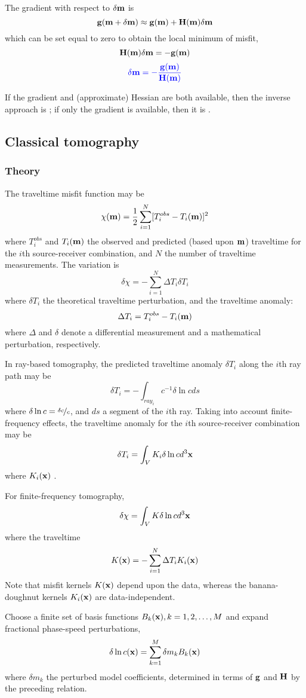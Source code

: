 The gradient with respect to $\delta\mathbf{m}$ is
\[ \mathbf{g}(\mathbf{m}+\delta\mathbf{m})\approx\mathbf{g}(\mathbf{m})+\mathbf{H}(\mathbf{m})\delta\mathbf{m} \]
which can be set equal to zero to obtain the local minimum of misfit,
\[ \mathbf{H}(\mathbf{m})\delta\mathbf{m}=-\mathbf{g}(\mathbf{m}) \]
\[ {\color{blue}\delta\mathbf{m}=-\frac{\mathbf{g}(\mathbf{m})}{\mathbf{H}(\mathbf{m})}} \]

If the gradient and (approximate) Hessian are both available,
then the inverse approach is ;
if only the gradient is available, then it is .

\subsection{Classical tomography}
\subsubsection{Theory}
The traveltime misfit function may be
\[ \chi(\mathbf{m})=\frac{1}{2}\sum_{i=1}^N[T_i^{obs}-T_i(\mathbf{m})]^2 \]
where $T_i^{obs}$ and $T_i(\mathbf{m})$ the observed and predicted (based upon $\mathbf{m}$) traveltime
for the $i$th source-receiver combination, and $N$ the number of traveltime measurements.
The variation is
\[ \delta\chi=-\sum_{i=1}^N\Delta T_i\delta T_i \]
where $\delta T_i$ the theoretical traveltime perturbation, and the traveltime anomaly:
\[ \Delta T_i=T_i^{obs}-T_i(\mathbf{m}) \]
where $\Delta$ and $\delta$ denote a differential measurement and a mathematical perturbation,
respectively.

In ray-based tomography,
the predicted traveltime anomaly $\delta T_i$ along the $i$th ray path may be
\[ \delta T_i=-\int_{ray_i}c^{-1}\delta\ln cds \]
where  $\delta\ln c=\nicefrac{\delta c}{c}$,
and $ds$ a segment of the $i$th ray.
Taking into account finite-frequency effects,
the traveltime anomaly for the $i$th source-receiver combination may be
\[ \delta T_i=\int_VK_i\delta\ln cd^3\mathbf{x} \]
where $K_i(\mathbf{x})$ .

For finite-frequency tomography,
\[ \delta\chi=\int_VK\delta\ln cd^3\mathbf{x} \]
where the traveltime 
\[ K(\mathbf{x})=-\sum_{i=1}^N\Delta T_iK_i(\mathbf{x}) \]
Note that misfit kernels $K(\mathbf{x})$ depend upon the data,
whereas the banana-doughnut kernels $K_i(\mathbf{x})$ are data-independent.

Choose a finite set of basis functions $B_k(\mathbf{x}),k=1,2,\ldots,M$
and expand fractional phase-speed perturbations,
\[ \delta\ln c(\mathbf{x})=\sum_{k=1}^M\delta m_kB_k(\mathbf{x}) \]
where $\delta m_k$ the perturbed model coefficients,
determined in terms of $\mathbf{g}$ and $\mathbf{H}$ by the preceding relation.

